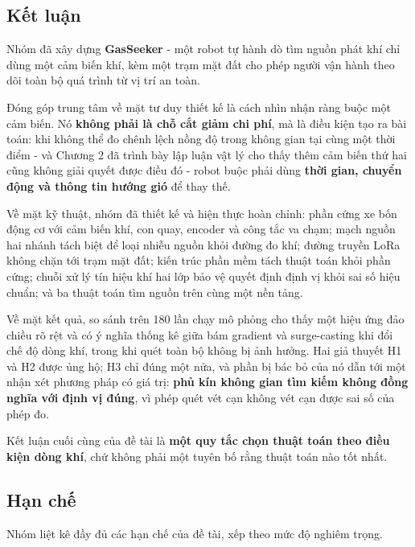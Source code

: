 \subsection{Kết luận}
Nhóm đã xây dựng \textbf{GasSeeker} - một robot tự hành dò tìm nguồn phát khí chỉ dùng một cảm biến khí, kèm một trạm mặt đất cho phép người vận hành theo dõi toàn bộ quá trình từ vị trí an toàn.

Đóng góp trung tâm về mặt tư duy thiết kế là cách nhìn nhận ràng buộc một cảm biến. Nó \textbf{không phải là chỗ cắt giảm chi phí}, mà là điều kiện tạo ra bài toán: khi không thể đo chênh lệch nồng độ trong không gian tại cùng một thời điểm - và Chương 2 đã trình bày lập luận vật lý cho thấy thêm cảm biến thứ hai cũng không giải quyết được điều đó - robot buộc phải dùng \textbf{thời gian, chuyển động và thông tin hướng gió} để thay thế.

Về mặt kỹ thuật, nhóm đã thiết kế và hiện thực hoàn chỉnh: phần cứng xe bốn động cơ với cảm biến khí, con quay, encoder và công tắc va chạm; mạch nguồn hai nhánh tách biệt để loại nhiễu nguồn khỏi đường đo khí; đường truyền LoRa không chặn tới trạm mặt đất; kiến trúc phần mềm tách thuật toán khỏi phần cứng; chuỗi xử lý tín hiệu khí hai lớp bảo vệ quyết định định vị khỏi sai số hiệu chuẩn; và ba thuật toán tìm nguồn trên cùng một nền tảng.

Về mặt kết quả, so sánh trên 180 lần chạy mô phỏng cho thấy một hiệu ứng đảo chiều rõ rệt và có ý nghĩa thống kê giữa bám gradient và surge-casting khi đổi chế độ dòng khí, trong khi quét toàn bộ không bị ảnh hưởng. Hai giả thuyết H1 và H2 được ủng hộ; H3 chỉ đúng một nửa, và phần bị bác bỏ của nó dẫn tới một nhận xét phương pháp có giá trị: \textbf{phủ kín không gian tìm kiếm không đồng nghĩa với định vị đúng}, vì phép quét vét cạn không vét cạn được sai số của phép đo.

Kết luận cuối cùng của đề tài là \textbf{một quy tắc chọn thuật toán theo điều kiện dòng khí}, chứ không phải một tuyên bố rằng thuật toán nào tốt nhất.


\subsection{Hạn chế}
Nhóm liệt kê đầy đủ các hạn chế của đề tài, xếp theo mức độ nghiêm trọng.

